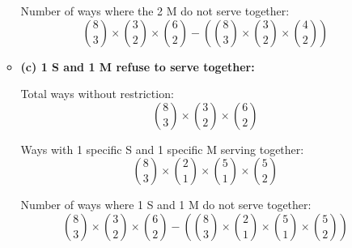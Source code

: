 \documentclass{book}
\begin{document}
\begin{enumerate}
\begin{itemize}
		            Number of ways where the 2 M do not serve together:
		            \[
			            \binom{8}{3} \times \binom{3}{2} \times \binom{6}{2} - \left( \binom{8}{3} \times \binom{3}{2} \times \binom{4}{2} \right)
		            \]
		      \item \textbf{(c) 1 S and 1 M refuse to serve together:}

		            Total ways without restriction:
		            \[ \binom{8}{3} \times \binom{3}{2} \times \binom{6}{2} \]

		            Ways with 1 specific S and 1 specific M serving together:
		            \[ \binom{8}{3} \times \binom{2}{1} \times \binom{5}{1} \times \binom{5}{2} \]

		            Number of ways where 1 S and 1 M do not serve together:
		            \[
			            \binom{8}{3} \times \binom{3}{2} \times \binom{6}{2} - \left( \binom{8}{3} \times \binom{2}{1} \times \binom{5}{1} \times \binom{5}{2} \right)
		            \]
	      \end{itemize}
\end{enumerate}
\end{document}
